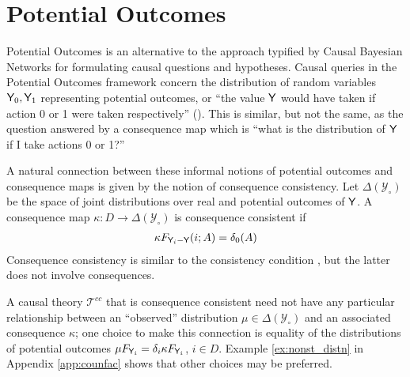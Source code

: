 
\section{Potential Outcomes}

Potential Outcomes is an alternative to the approach typified by Causal Bayesian Networks for formulating causal questions and hypotheses. Causal queries in the Potential Outcomes framework concern the distribution of random variables $\mathsf{Y}_0, \mathsf{Y}_1$ representing potential outcomes, or ``the value $\mathsf{Y}$ would have taken if action 0 or 1 were taken respectively'' (\cite{angrist_mastering_2014}). This is similar, but not the same, as the question answered by a consequence map which is ``what is the distribution of $\mathsf{Y}$ if I take actions 0 or 1?''

A natural connection between these informal notions of potential outcomes and consequence maps is given by the notion of consequence consistency. Let $\Delta(\mathcal{Y}_\circ)$ be the space of joint distributions over real and potential outcomes of $\mathsf{Y}$. A consequence map $\kappa:D\to \Delta(\mathcal{Y}_\circ)$ is consequence consistent if
\begin{align}
    \kappa F_{\mathsf{Y}_i-\mathsf{Y}} (i;A)=\delta_0(A) \label{eq:oc_consist}
\end{align} 
Consequence consistency is similar to the consistency condition \citep{richardson2013single}, but the latter does not involve consequences.

A causal theory $\mathscr{T}^{cc}$ that is consequence consistent need not have any particular relationship between an ``observed'' distribution $\mu\in \Delta(\mathcal{Y}_\circ)$ and an associated consequence $\kappa$; one choice to make this connection is equality of the distributions of potential outcomes $\mu F_{\mathsf{Y}_i} = \delta_i \kappa F_{\mathsf{Y}_i}$, $i\in D$. Example \ref{ex:nonst_distn} in Appendix \ref{app:counfac} shows that other choices may be preferred.


